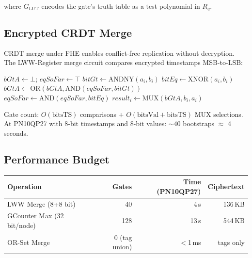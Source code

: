 where $G_{\text{LUT}}$ encodes the gate's truth table as a test
polynomial in $R_q$.

\subsection{Encrypted CRDT Merge}

CRDT merge under FHE enables conflict-free replication without
decryption. The LWW-Register merge circuit compares encrypted
timestamps MSB-to-LSB:

\begin{algorithmic}[1]
\State $\mathit{bGtA} \gets \bot$; $\mathit{eqSoFar} \gets \top$
  \State $\mathit{bitGt} \gets \text{ANDNY}(a_i, b_i)$
  \State $\mathit{bitEq} \gets \text{XNOR}(a_i, b_i)$
  \State $\mathit{bGtA} \gets \text{OR}(\mathit{bGtA},
         \text{AND}(\mathit{eqSoFar}, \mathit{bitGt}))$
  \State $\mathit{eqSoFar} \gets \text{AND}(\mathit{eqSoFar},
         \mathit{bitEq})$
\EndFor
{}
  \State $\mathit{result}_i \gets \text{MUX}(\mathit{bGtA}, b_i, a_i)$
\EndFor
\end{algorithmic}

Gate count: $O(\text{bitsTS})$ comparisons + $O(\text{bitsVal} +
\text{bitsTS})$ MUX selections. At PN10QP27 with 8-bit timestamps
and 8-bit values: $\sim$40 bootstraps $\approx$ 4 seconds.

\subsection{Performance Budget}

\begin{center}
\begin{tabular}{lrrr}
\toprule
\textbf{Operation} & \textbf{Gates} & \textbf{Time (PN10QP27)} & \textbf{Ciphertext} \\
\midrule
LWW Merge (8+8 bit) & 40 & 4\,s & 136\,KB \\
GCounter Max (32 bit/node) & 128 & 13\,s & 544\,KB \\
OR-Set Merge & 0 (tag union) & $<$1\,ms & tags only \\
\bottomrule
\end{tabular}
\end{center}

